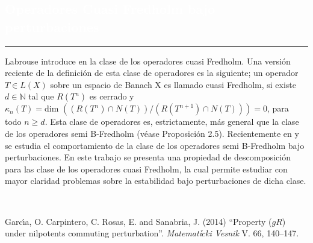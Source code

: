 \begin{titlepage}
\pagecolor{white}
\BgThispage
{}
\vspace*{-1.1cm}
\noindent
\def\titulo#1{\section{#1}}
\section{\bf\large\textcolor{white}{Operadores Cuasi Fredholm bajo perturbaciones}}
\vspace*{2cm}\par
\noindent

\begin{minipage}{0.5\linewidth}
\begin{minipage}{0.45\linewidth}
    \begin{flushright}
        \printauthor
    \end{flushright}
\end{minipage} \hspace{0pt}
%
\begin{minipage}{0.02\linewidth}
      \color{ptctitle} \rule{1pt}{175pt}
\end{minipage} 
\end{minipage}
\hspace*{-4.5cm}
%
\begin{minipage}{0.85\linewidth}
\begin{minipage}{0.85\linewidth}
\footnotesize
\vspace{5pt}
    \begin{resumen} 
Labrouse introduce en \cite{la} la clase de los operadores cuasi Fredholm. Una versi\'on reciente de la definici\'on de esta clase de operadores es la siguiente; un operador  $T\in L(X)$ sobre un espacio de Banach X es llamado cuasi Fredholm, si existe $d\in\mathbb{N}$ tal que $R(T^{n})$ es cerrado y $\kappa_n(T)=\mbox{dim }((R(T^n)\cap N(T))/(R(T^{n+1})\cap N(T)))=0$, para todo $n\geq d$. Esta clase de operadores es, estrictamente, m\'as general que la clase de los operadores semi B-Fredholm (v\'ease \cite{la} Proposici\'on 2.5). Recientemente en \cite{orlando I} y \cite{orlando II} se estudia el comportamiento de la clase de los operadores semi B-Fredholm bajo perturbaciones. En este trabajo se presenta una propiedad de descomposici\'on para las clase de los ope{\break}radores cuasi Fredholm, la cual permite estudiar con mayor claridad problemas sobre la estabilidad bajo perturbaciones de dicha clase.
    \end{resumen}
   \end{minipage}
   \vspace{10pt}
\end{minipage}
\vspace{10pt}\\[5pt]
\begin{thebibliography}{99}
 {\sc Garc\'{\i}a, O. Carpintero, C. Rosas, E. and Sanabria, J.} (2014) ``Property ($gR$) under nilpotents commuting perturbation''. \emph{Matemati$\check{c}$ki Vesnik} V. 66, 140--147.


\end{thebibliography}
\end{titlepage}
